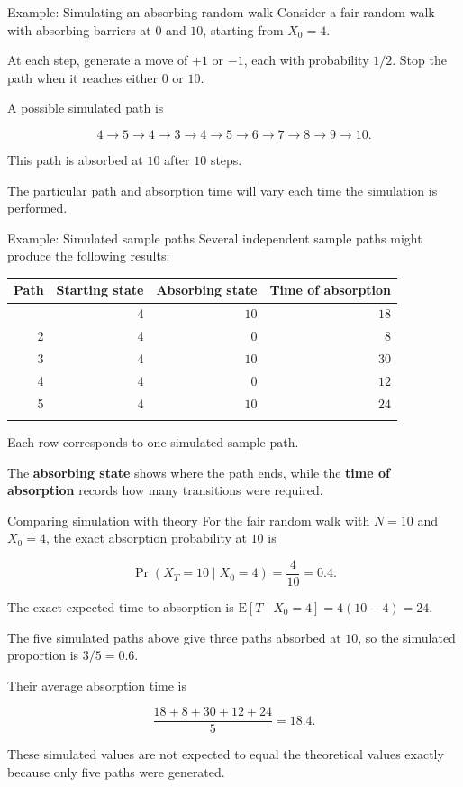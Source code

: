 \documentclass[
  ignorenonframetext,
  aspectratio=169,
]{beamer}
\newcounter{none} %
\begin{document}
\begin{frame}{Example: Simulating an absorbing random walk}
\protect{}\label{example-simulating-an-absorbing-random-walk}
Consider a fair random walk with absorbing barriers at \(0\) and \(10\),
starting from \(X_0=4\).

At each step, generate a move of \(+1\) or \(-1\), each with probability
\(1/2\). Stop the path when it reaches either \(0\) or \(10\).

A possible simulated path is

\[
4\rightarrow5\rightarrow4\rightarrow3\rightarrow4\rightarrow5
\rightarrow6\rightarrow7\rightarrow8\rightarrow9\rightarrow10.
\]

This path is absorbed at \(10\) after \(10\) steps.

The particular path and absorption time will vary each time the
simulation is performed.
\end{frame}

\begin{frame}{Example: Simulated sample paths}
\protect{}\label{example-simulated-sample-paths}
Several independent sample paths might produce the following results:

{\def\LTcaptype{none} %
\begin{longtable}[]{@{}rrrr@{}}
\toprule\noalign{}
Path & Starting state & Absorbing state & Time of absorption \\
\midrule\noalign{}
\endhead
1 & \(4\) & \(10\) & \(18\) \\
2 & \(4\) & \(0\) & \(8\) \\
3 & \(4\) & \(10\) & \(30\) \\
4 & \(4\) & \(0\) & \(12\) \\
5 & \(4\) & \(10\) & \(24\) \\
\bottomrule\noalign{}
\end{longtable}
}

Each row corresponds to one simulated sample path.

The \textbf{absorbing state} shows where the path ends, while the
\textbf{time of absorption} records how many transitions were required.
\end{frame}

\begin{frame}{Comparing simulation with theory}
\protect{}\label{comparing-simulation-with-theory}
For the fair random walk with \(N=10\) and \(X_0=4\), the exact
absorption probability at \(10\) is

\[
\Pr(X_T=10\mid X_0=4)=\frac4{10}=0.4.
\]

The exact expected time to absorption is
\(\mathrm{E}[T\mid X_0=4]=4(10-4)=24.\)

The five simulated paths above give three paths absorbed at \(10\), so
the simulated proportion is \(3/5=0.6\).

Their average absorption time is

\[
\frac{18+8+30+12+24}{5}=18.4.
\]

These simulated values are not expected to equal the theoretical values
exactly because only five paths were generated.
\end{frame}
\end{document}
